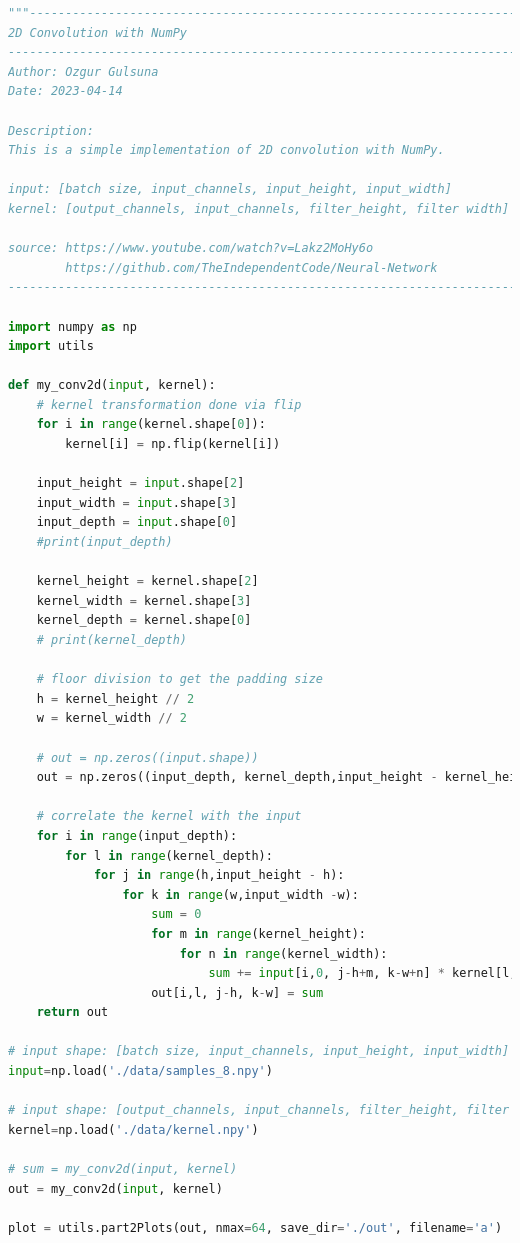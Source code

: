 \documentclass[3p,times,procedia]{elsarticle}
\begin{document}
\begin{lstlisting}[language=Python]
    """-----------------------------------------------------------------------------
2D Convolution with NumPy
--------------------------------------------------------------------------------
Author: Ozgur Gulsuna
Date: 2023-04-14

Description:
This is a simple implementation of 2D convolution with NumPy.

input: [batch size, input_channels, input_height, input_width]
kernel: [output_channels, input_channels, filter_height, filter width]

source: https://www.youtube.com/watch?v=Lakz2MoHy6o
        https://github.com/TheIndependentCode/Neural-Network
------------------------------------------------------------------------------"""

import numpy as np
import utils

def my_conv2d(input, kernel):
    # kernel transformation done via flip
    for i in range(kernel.shape[0]):
        kernel[i] = np.flip(kernel[i])
    
    input_height = input.shape[2]
    input_width = input.shape[3]
    input_depth = input.shape[0]
    #print(input_depth)

    kernel_height = kernel.shape[2]
    kernel_width = kernel.shape[3]
    kernel_depth = kernel.shape[0]
    # print(kernel_depth)

    # floor division to get the padding size 
    h = kernel_height // 2
    w = kernel_width // 2

    # out = np.zeros((input.shape))
    out = np.zeros((input_depth, kernel_depth,input_height - kernel_height + 1, input_width - kernel_width + 1))

    # correlate the kernel with the input
    for i in range(input_depth):
        for l in range(kernel_depth):
            for j in range(h,input_height - h):
                for k in range(w,input_width -w):
                    sum = 0
                    for m in range(kernel_height):
                        for n in range(kernel_width):
                            sum += input[i,0, j-h+m, k-w+n] * kernel[l,0, m, n]
                    out[i,l, j-h, k-w] = sum
    return out

# input shape: [batch size, input_channels, input_height, input_width]
input=np.load('./data/samples_8.npy')

# input shape: [output_channels, input_channels, filter_height, filter width]
kernel=np.load('./data/kernel.npy')

# sum = my_conv2d(input, kernel)
out = my_conv2d(input, kernel)

plot = utils.part2Plots(out, nmax=64, save_dir='./out', filename='a')


    
\end{lstlisting}
\end{document}
